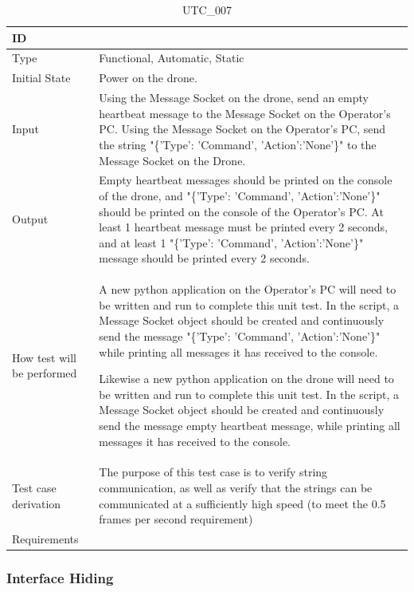 \documentclass[12pt, titlepage]{article}
\begin{document}
\begin{table}[!h]
\begin{center}
\caption {UTC\_007}
\label{tab:UTC_007}
\begin{tabular}{ | m{3.2cm} | m{12.2cm} | } 
\hline
ID & \nameref{tab:UTC_007} \\ 
\hline
Type &  Functional, Automatic, Static  \\ 
\hline
Initial State & Power on the drone.\\ 
\hline
Input &  Using the Message Socket on the drone, send an empty heartbeat message to the Message Socket on the Operator's PC. Using the Message Socket on the Operator's PC, send the string "\{'Type': 'Command', 'Action':'None'\}" to the Message Socket on the Drone. \\ 
\hline
Output &  Empty heartbeat messages should be printed on the console of the drone, and  "\{'Type': 'Command', 'Action':'None'\}" should be printed on the console of the Operator's PC. At least 1 heartbeat message must be printed every 2 seconds, and at least 1 "\{'Type': 'Command', 'Action':'None'\}" message should be printed every 2 seconds. \\ 
\hline
How test will be performed & A new python application on the Operator's PC will need to be written and run to complete this unit test. In the script, a Message Socket object should be created and continuously send the message "\{'Type': 'Command', 'Action':'None'\}" while printing all messages it has received to the console.  

 Likewise a new python application on the drone will need to be written and run to complete this unit test. In the script, a Message Socket object should be created and continuously send the message empty heartbeat message, while printing all messages it has received to the console. \\ 
\hline
Test case derivation & The purpose of this test case is to verify string communication, as well as verify that the strings can be communicated at a sufficiently high speed (to meet the 0.5 frames per second requirement) \\ 
\hline
Requirements & \nameref{PERF_004} \\ 
\hline
\end{tabular}
\end{center}
\end{table}

\subsubsection{Interface Hiding}
\end{document}
